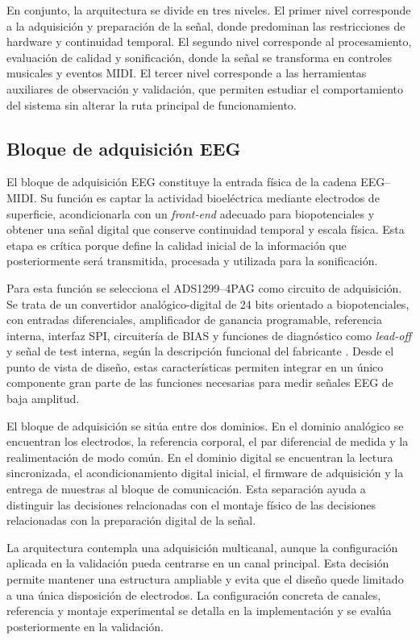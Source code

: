 \documentclass[../main.tex]{subfiles}
\begin{document}
En conjunto, la arquitectura se divide en tres niveles. El primer nivel corresponde a la adquisición y preparación de la señal, donde predominan las restricciones de hardware y continuidad temporal. El segundo nivel corresponde al procesamiento, evaluación de calidad y sonificación, donde la señal se transforma en controles musicales y eventos MIDI. El tercer nivel corresponde a las herramientas auxiliares de observación y validación, que permiten estudiar el comportamiento del sistema sin alterar la ruta principal de funcionamiento.

\subsection{Bloque de adquisición EEG}

El bloque de adquisición EEG constituye la entrada física de la cadena EEG--MIDI. Su función es captar la actividad bioeléctrica mediante electrodos de superficie, acondicionarla con un \textit{front-end} adecuado para biopotenciales y obtener una señal digital que conserve continuidad temporal y escala física. Esta etapa es crítica porque define la calidad inicial de la información que posteriormente será transmitida, procesada y utilizada para la sonificación.

Para esta función se selecciona el ADS1299--4PAG como circuito de adquisición. Se trata de un convertidor analógico-digital de 24 bits orientado a biopotenciales, con entradas diferenciales, amplificador de ganancia programable, referencia interna, interfaz SPI, circuitería de BIAS y funciones de diagnóstico como \textit{lead-off} y señal de test interna, según la descripción funcional del fabricante \cite{TexasInstrumentsADS1299}. Desde el punto de vista de diseño, estas características permiten integrar en un único componente gran parte de las funciones necesarias para medir señales EEG de baja amplitud.

El bloque de adquisición se sitúa entre dos dominios. En el dominio analógico se encuentran los electrodos, la referencia corporal, el par diferencial de medida y la realimentación de modo común. En el dominio digital se encuentran la lectura sincronizada, el acondicionamiento digital inicial, el firmware de adquisición y la entrega de muestras al bloque de comunicación. Esta separación ayuda a distinguir las decisiones relacionadas con el montaje físico de las decisiones relacionadas con la preparación digital de la señal.

La arquitectura contempla una adquisición multicanal, aunque la configuración aplicada en la validación pueda centrarse en un canal principal. Esta decisión permite mantener una estructura ampliable y evita que el diseño quede limitado a una única disposición de electrodos. La configuración concreta de canales, referencia y montaje experimental se detalla en la implementación y se evalúa posteriormente en la validación.
\end{document}
